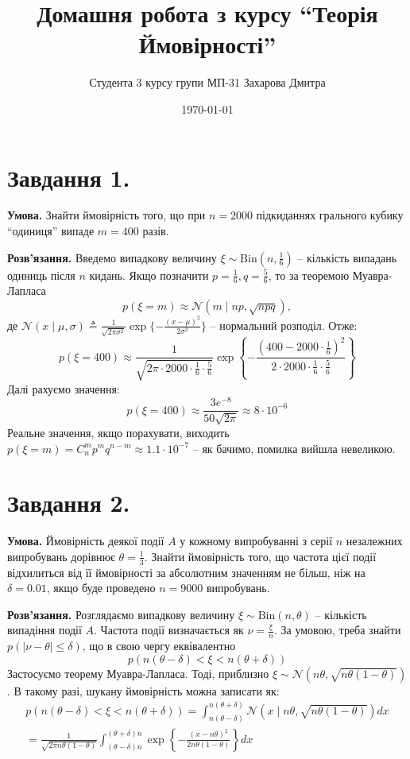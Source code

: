 \documentclass[14pt]{extarticle}
\title{Домашня робота з курсу ``Теорія Ймовірності''}
\author{Студента 3 курсу групи МП-31 Захарова Дмитра}
\date{\today}
\begin{document}
\maketitle

\section*{Завдання 1.} 

\textbf{Умова.} Знайти ймовірність того, що при $n=2000$ підкиданнях грального кубику ``одиниця'' випаде $m=400$ разів.

\textbf{Розв'язання.} Введемо випадкову величину $\xi \sim \text{Bin}(n,\frac{1}{6})$ -- кількість випадань одиниць після $n$ кидань. Якщо позначити $p=\frac{1}{6},q=\frac{5}{6}$, то за теоремою Муавра-Лапласа
\[
p(\xi = m) \approx \mathcal{N}(m \mid np, \sqrt{npq}),
\]
де $\mathcal{N}(x \mid \mu,\sigma) \triangleq \frac{1}{\sqrt{2\pi\sigma^2}}\exp \{-\frac{(x-\mu)^2}{2\sigma^2}\}$ -- нормальний розподіл. Отже:
\[
p(\xi = 400) \approx \frac{1}{\sqrt{2\pi \cdot 2000 \cdot \frac{1}{6} \cdot \frac{5}{6}}}\exp \left\{-\frac{(400-2000 \cdot \frac{1}{6})^2}{2 \cdot 2000 \cdot \frac{1}{6} \cdot \frac{5}{6}}\right\}
\]
Далі рахуємо значення:
\[
p(\xi = 400) \approx \frac{3e^{-8}}{50\sqrt{2\pi}} \approx 8 \cdot 10^{-6}
\]
Реальне значення, якщо порахувати, виходить $p(\xi=m)=C_n^m p^{m}q^{n-m} \approx 1.1 \cdot 10^{-7}$ -- як бачимо, помилка вийшла невеликою. 

\section*{Завдання 2.}

\textbf{Умова.} Ймовірність деякої події $A$ у кожному випробуванні з серії $n$ незалежних випробувань дорівнює $\theta=\frac{1}{3}$. Знайти ймовірність того, що частота цієї події відхилиться від її ймовірності за абсолютним значенням не більш, ніж на $\delta = 0.01$, якщо буде проведено $n = 9000$ випробувань.

\textbf{Розв'язання.} Розглядаємо випадкову величину $\xi \sim \text{Bin}(n,\theta)$ -- кількість випадіння події $A$. Частота події визначається як $\nu = \frac{\xi}{n}$. За умовою, треба знайти $p(|\nu - \theta| \leq \delta)$, що в свою чергу еквівалентно 
\[
p(n(\theta-\delta) < \xi < n(\theta+\delta))
\]
Застосуємо теорему Муавра-Лапласа. Тоді, приблизно $\xi \sim \mathcal{N}(n\theta,\sqrt{n\theta(1-\theta)})$. В такому разі, шукану ймовірність можна записати як:
\begin{gather*}
p(n(\theta-\delta) < \xi < n(\theta + \delta)) = \int_{n(\theta-\delta)}^{n(\theta+\delta)}\mathcal{N}(x \mid n\theta,\sqrt{n\theta(1-\theta)})dx \\
= \frac{1}{\sqrt{2\pi n\theta(1-\theta)}}\int_{(\theta-\delta)n}^{(\theta+\delta)n} \exp\left\{-\frac{(x-n\theta)^2}{2 n \theta(1-\theta)}\right\}dx
\end{gather*}
\end{document}
